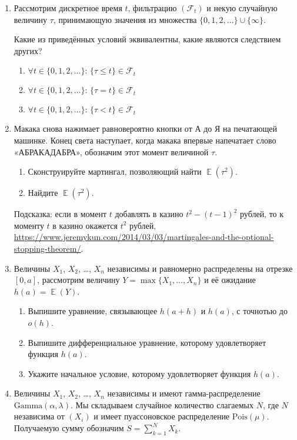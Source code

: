 \documentclass[12pt]{article}
\DeclareMathOperator{\E}{\mathbb{E}}
\newcommand{\dGamma}{\mathrm{Gamma}}
\newcommand{\dPois}{\mathrm{Pois}}
\begin{document}
\begin{enumerate}

\item Рассмотрим дискретное время $t$, фильтрацию $(\mathcal{F}_t)$ и некую случайную величину $\tau$, принимающую значения из множества $\{0, 1, 2, \dots\} \cup \{\infty\}$.

Какие из приведённых условий эквивалентны, какие являются следствием других?
\begin{enumerate}[label=\Alph*:]
    \item $\forall t \in \{0, 1, 2, \dots \}: \, \{\tau \leq t\} \in \mathcal{F}_t$
    \item $\forall t \in \{0, 1, 2, \dots \}: \, \{\tau = t\} \in \mathcal{F}_t$
    \item $\forall t \in \{0, 1, 2, \dots \}: \, \{\tau < t\} \in \mathcal{F}_t$
\end{enumerate}


\item Макака снова нажимает равновероятно кнопки от А до Я на печатающей машинке.
Конец света наступает, когда макака впервые напечатает слово «АБРАКАДАБРА»,
обозначим этот момент величиной $\tau$.

\begin{enumerate}
    \item Сконструируйте мартингал, позволяющий найти $\E(\tau^2)$.
    \item Найдите $\E(\tau^2)$.
\end{enumerate}

Подсказка: если в момент $t$ добавлять в казино $t^2 - (t-1)^2$ рублей, то к моменту $t$ в казино окажется $t^2$ рублей,
\url{https://www.jeremykun.com/2014/03/03/martingales-and-the-optional-stopping-theorem/}.


\item Величины $X_1$, $X_2$, \dots, $X_n$ независимы и равномерно распределены на отрезке $[0, a]$,
рассмотрим величину $Y = \max\{X_1, \dots, X_n\}$ и её ожидание $h(a) = \E(Y)$.
\begin{enumerate}
    \item Выпишите уравнение, связывающее $h(a + h)$ и $h(a)$, с точнотью до $o(h)$.
    \item Выпишите дифференциальное уравнение, которому удовлетворяет функция $h(a)$.
    \item Укажите начальное условие, которому удовлетворяет функция $h(a)$.
\end{enumerate}


\item Величины $X_1$, $X_2$, \dots, $X_n$ независимы и имеют гамма-распределение $\dGamma(\alpha, \lambda)$.
Мы складываем случайное количество слагаемых $N$, где $N$ независима от $(X_i)$ и имеет пуассоновское распределение $\dPois(\mu)$.
Получаемую сумму обозначим $S = \sum_{k=1}^N X_k$.


\end{enumerate}
\end{document}
